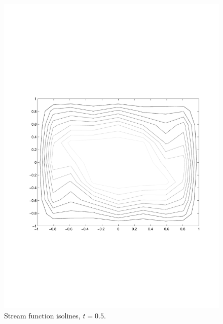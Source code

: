\begin{multicols}{2}

\begin{figure}[H]
\centering
\includegraphics[scale=0.45, trim = 30mm 75mm 15mm 80mm, clip]{./Figures/4-IVBP/stream_t_5.pdf}
\caption{Stream function isolines, $t=0.5$.
}
\end{figure}


\columnbreak


\end{multicols}
